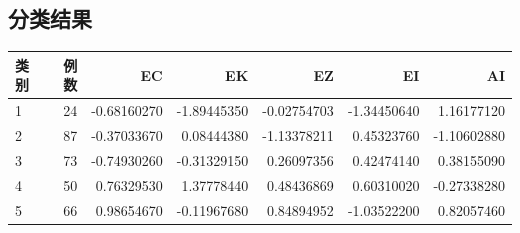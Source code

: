 \subsection{分类结果}
\par\addvspace{5pt}\begin{center}\begin{minipage}{\linewidth}\centering
\small
{}
\begin{tabular}{lrrrrrr}\toprule
{\bfseries 类别 }&{\bfseries  例数 }&{\bfseries  EC }&{\bfseries  EK }&{\bfseries  EZ }&{\bfseries  EI }&{\bfseries  AI}\\\midrule
1 & 24 & -0.68160270 & -1.89445350 & -0.02754703 & -1.34450640 & 1.16177120\\
2 & 87 & -0.37033670 & 0.08444380 & -1.13378211 & 0.45323760 & -1.10602880\\
3 & 73 & -0.74930260 & -0.31329150 & 0.26097356 & 0.42474140 & 0.38155090\\
4 & 50 & 0.76329530 & 1.37778440 & 0.48436869 & 0.60310020 & -0.27338280\\
5 & 66 & 0.98654670 & -0.11967680 & 0.84894952 & -1.03522200 & 0.82057460\\
\bottomrule\end{tabular}
\end{minipage}\end{center}

